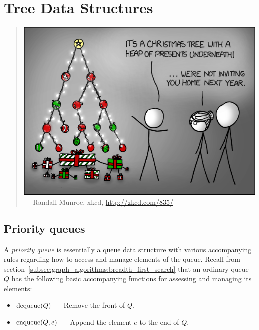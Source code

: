 
\chapter{Tree Data Structures}
\label{chap:tree_data_structures}

\begin{quote}
\includegraphics[scale=0.7]{image/tree-data-structures/tree.png} \\
\noindent
--- Randall Munroe, xkcd,
\url{http://xkcd.com/835/}
\end{quote}



\section{Priority queues}

A \emph{priority queue} is essentially a queue
data structure with various accompanying rules regarding how to access
and manage elements of the queue. Recall from
section~\ref{subsec:graph_algorithms:breadth_first_search} that an
ordinary queue $Q$ has the following basic accompanying functions for
assessing and managing its elements:
\begin{itemize}
\item $\operatorname*{dequeue}(Q)$ --- Remove the front of $Q$.

\item $\operatorname*{enqueue}(Q, e)$ --- Append the element $e$ to the end of $Q$.
\end{itemize}

